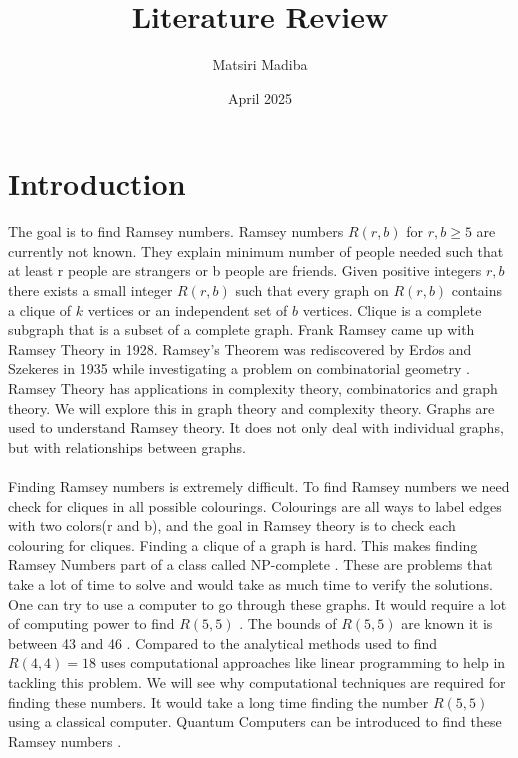 \documentclass{Assignment}
\author{Matsiri Madiba}
\date{April 2025}
\title{Literature Review}
\begin{document}
\maketitle
\section{Introduction}
The goal is to find Ramsey numbers.
Ramsey numbers $R(r,b)$ for $r,b \geq  5$ are currently not known.
They explain minimum number of people needed such that at least r people are strangers or b people are friends.
Given positive integers $r, b$ there exists a small integer $R(r,b)$ such that every graph on $R(r,b)$ contains a clique of $k$ vertices or an independent set of $b$ vertices.
Clique is a complete subgraph that is a subset of a complete graph.\cite{BondyMurty2008}
Frank Ramsey came up with Ramsey Theory in 1928.
Ramsey's Theorem was rediscovered by Erd$\ddot{o}$s and Szekeres in 1935 while investigating a problem on combinatorial geometry \cite{BondyMurty2008}.									
Ramsey Theory has applications in complexity theory, combinatorics and graph theory. 
We will explore this in graph theory and complexity theory.
Graphs are used to understand Ramsey theory.
It does not only deal with individual graphs, but with relationships between graphs.\cite{burr1981generalized}
\\\\
Finding Ramsey numbers is extremely difficult.
To find Ramsey numbers we need check for cliques in all possible colourings.
Colourings are all ways to label edges with two colors(r and b), and the goal in Ramsey theory is to check each colouring for cliques.
Finding a clique of a graph is hard.
This makes finding Ramsey Numbers part of a class called NP-complete  \cite{burr1981generalized}. 
These are problems that take a lot of time to solve and would take as much time to verify the solutions. 
One can try to use a computer to go through these graphs.
It would require a lot of computing power to find $R(5,5)$ \cite{spencer1994}.
The bounds of $R(5,5)$ are known it is between 43 \cite{Exoo1993} and 46 \cite{angeltveit2024r55le46}.
Compared to the analytical methods used to find $R(4,4)=18$ \cite{GreenwoodGleason1955} uses computational approaches like linear programming to help in tackling this problem.
We will see why computational techniques are required for finding these numbers.
It would take a long time finding the number $R(5,5)$ using a classical computer.
Quantum Computers can be introduced to find these Ramsey numbers \cite{PhysRevA.93.032301}.
\end{document}
